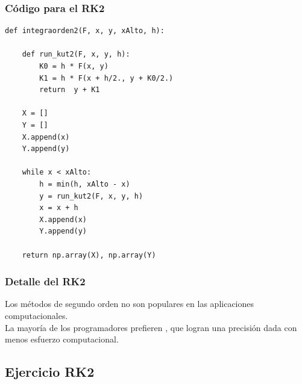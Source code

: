 \documentclass[12pt]{beamer}
\begin{document}
\begin{frame}
\frametitle{Código para el RK2}
\begin{lstlisting}[caption=Código que utiliza el método de RK2]
def integraorden2(F, x, y, xAlto, h):

    def run_kut2(F, x, y, h):
        K0 = h * F(x, y)
        K1 = h * F(x + h/2., y + K0/2.)
        return  y + K1
    
    X = []
    Y = []
    X.append(x)
    Y.append(y)
    
    while x < xAlto:
        h = min(h, xAlto - x)
        y = run_kut2(F, x, y, h)
        x = x + h
        X.append(x)
        Y.append(y)
    
    return np.array(X), np.array(Y)
\end{lstlisting}
\end{frame}
\begin{frame}
\frametitle{Detalle del RK2}
Los métodos de segundo orden no son populares en las aplicaciones computacionales.
\\
\bigskip
\pause
La mayoría de los programadores prefieren , que logran una precisión dada con menos esfuerzo computacional.
\end{frame}

\subsection{Ejercicio RK2}
\end{document}

